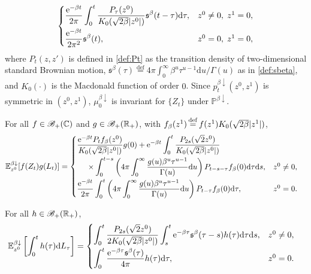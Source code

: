 \documentclass[12pt, twoside]{article}
\numberwithin{figure}{section}
\newcommand{\e}{{\mathrm e}}
\newcommand{\1}{\mathds 1}
\newcommand{\B}{\mathscr B}
\newcommand{\da}{{\downarrow}}
\renewcommand{\P}{{\mathbb P}}
\newcommand{\E}{{\mathbb E}}
\renewcommand{\d}{{\mathrm d}}
\newcommand{\R}{{\Bbb R}}
\newcommand{\2}{{\mathbf 1}}
\newcommand{\s}{{\mathfrak s}}
\newcommand{\defeq}{{\stackrel{\rm def}{=}}}
\newcommand{\cc}{{^\circ}}
\newcommand{\two}{{\sqrt{2}}}
\begin{document}
\begin{thm}
\begin{align}
\begin{cases}
\displaystyle \frac{\e^{-\beta t}}{2\pi}\int_0^t \frac{P_{\tau}(z^0)}{K_0(\sqrt{2\beta }|z^0|)}\s^\beta(t-\tau) \d \tau,&z^0\neq 0,\;z^1= 0,
\\
\vspace{-.4cm}\\
\displaystyle
\frac{\e^{-\beta t}}{2\pi^2}\s^\beta(t),&z^0=0,\;z^1=0,
\end{cases}
\end{align}
where $P_t(z,z')$ is defined in \eqref{def:Pt} as the transition density of two-dimensional standard Brownian motion,
$\s^\beta(\tau)\!\stackrel{\mathrm{def}} {=}\! 4\pi\int_0^\infty \beta^u\tau^{u-1}\d u/\Gamma(u)$ as in \eqref{def:sbeta},
and $K_0(\cdot)$ is the Macdonald function of order $0$.
Since $p^{\beta\da}_t(z^0,z^1)$ is symmetric in $(z^0,z^1)$, $\mu_0^{\beta\da}$ is invariant for $\{Z_t\}$ under $\P^{\beta\da}$.
\smallskip 

\noindent {\rm (2$\cc$)} For all $f\in \B_+(\Bbb C)$ and $g\in \B_+(\Bbb \R_+)$, with $f_{\beta}(z^1)\,\defeq\, f(z^1)K_0(\sqrt{2\beta}|z^1|)$,
\begin{align}
\E^{\beta\da}_{z^0}[f(Z_t)g(L_t)]
&=
\begin{cases}
\displaystyle \frac{\e^{-\beta t}P_{t}f_{\beta}(z^0)}{K_0(\sqrt{2\beta}|z^0|)}g(0)+\e^{-\beta t}\int_0^t\frac{P_{2s}(\two z^0)}{K_0(\sqrt{2\beta}|z^0|)} \\
\vspace{-.4cm}\\
\displaystyle \hspace{.5cm}\times\int_0^{t-s} \left(4\pi\int_0^\infty \frac{g(u)\beta^u\tau^{u-1}}{\Gamma(u)}\d u \right) P_{t-s-\tau}f_{\beta}(0)\d \tau\d s, &z^0\neq 0,\\
\vspace{-.4cm}\\
\displaystyle \frac{\e^{-\beta t}}{2\pi}\int_0^t \left(4\pi\int_0^\infty \frac{g(u)\beta^u\tau^{u-1}}{\Gamma(u)} \d u\right) P_{t-\tau}f_{\beta}(0)\d \tau,&z^0=0.
\label{DY:law1}
\end{cases}
\end{align}

\noindent {\rm (3$\cc$)} For all $h\in \B_+(\R_+)$,
\begin{align}\label{DY:law2}
&\E^{\beta\da}_{z^0}\left[\int_0^t h(\tau)\d L_\tau \right]=
\begin{cases}
\displaystyle \int_0^t
\frac{P_{2s}(\two z^0)}{2K_0(\sqrt{2\beta}|z^0|)}
\int_{s}^{t}  \e^{-\beta \tau}\s^{\beta}(\tau-s)h(\tau)\d\tau \d s,&z^0\neq 0,\\
\vspace{-.4cm}\\
\displaystyle \int_0^t \frac{\e^{-\beta \tau}\s^\beta(\tau)}{4\pi}h(\tau)\d \tau,&z^0=0.
\end{cases}
\end{align}


\end{thm}
\end{document}
